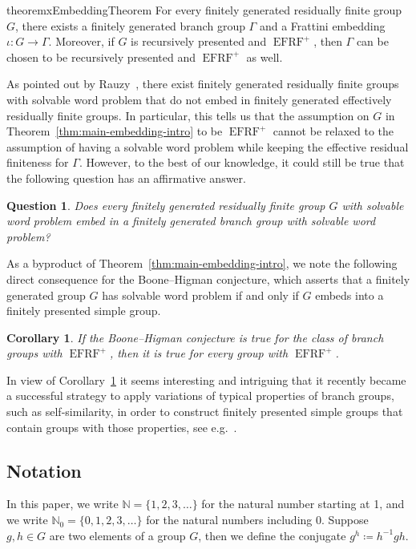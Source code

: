 \documentclass[a4paper]{amsart}
\numberwithin{equation}{section}
\newtheorem{corollary}[theorem]{Corollary}
\newtheorem{question}[theorem]{Question}
\theoremstyle{definition}
\theoremstyle{remark}
\newcommand{\N}{\mathbb{N}}
\DeclareMathOperator{\EFRF}{EFRF}
\begin{document}
\begin{restatable}{theoremx}{EmbeddingTheorem}\label{thm:main-embedding-intro}
For every finitely generated residually finite group $G$, there exists a finitely generated branch group $\Gamma$ and a Frattini embedding $\iota \colon G \rightarrow \Gamma$.
Moreover, if $G$ is recursively presented and $\EFRF^{+}$, then $\Gamma$ can be chosen to be recursively presented and $\EFRF^{+}$ as well.
\end{restatable}

\noindent As pointed out by Rauzy~\cite[Theorem 2]{Rauzy2021}, there exist finitely generated residually finite groups with solvable word problem that do not embed in finitely generated effectively residually finite groups.
In particular, this tells us that the assumption on $G$ in Theorem~\ref{thm:main-embedding-intro} to be $\EFRF^{+}$ cannot be relaxed to the assumption of having a solvable word problem while keeping the effective residual finiteness for $\Gamma$.
However, to the best of our knowledge, it could still be true that the following question has an affirmative answer.

\begin{question}\label{quest:BH-for-branch}
Does every finitely generated residually finite group $G$ with solvable word problem embed in a finitely generated branch group with solvable word problem?
\end{question}

\noindent As a byproduct of Theorem~\ref{thm:main-embedding-intro}, we note the following direct consequence for the Boone--Higman conjecture, which asserts that a finitely generated group $G$ has solvable word problem if and only if $G$ embeds into a finitely presented simple group.

\begin{corollary}\label{cor:boone-higman}
If the Boone--Higman conjecture is true for the class of branch groups with $\EFRF^{+}$, then it is true for every group with $\EFRF^{+}$.
\end{corollary}

\noindent In view of Corollary~\ref{cor:boone-higman} it seems interesting and intriguing that it recently became a successful strategy to apply variations of typical properties of branch groups, such as self-similarity, in order to construct finitely presented simple groups that contain groups with those properties, see e.g.~\cite{BelkBleakMatucciZaremsky2023,BelkMatucci2024,Zaremsky2025}.

\subsection*{Notation}
In this paper, we write $\N = \{1,2,3,\ldots\}$ for the natural number starting at 1, and we write $\N_0=\{0,1,2,3,\ldots\}$ for the natural numbers including 0.
Suppose $g,h\in G$ are two elements of a group $G$, then we define the conjugate $g^h \coloneqq h^{-1}gh$.
\end{document}
